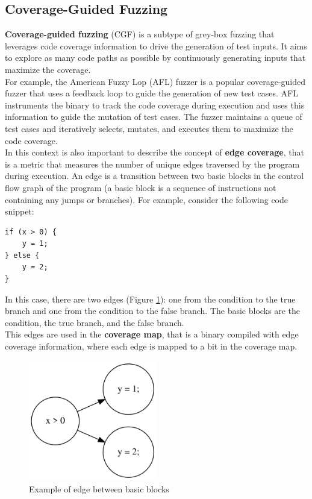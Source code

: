 \subsection{Coverage-Guided Fuzzing}
\textbf{Coverage-guided fuzzing} (CGF) is a subtype of grey-box fuzzing that leverages code coverage information to drive the generation of test inputs. It aims to explore as many code paths as possible by continuously generating inputs that maximize the coverage.
\\For example, the American Fuzzy Lop (AFL) fuzzer is a popular coverage-guided fuzzer that uses a feedback loop to guide the generation of new test cases. AFL instruments the binary to track the code coverage during execution and uses this information to guide the mutation of test cases. The fuzzer maintains a queue of test cases and iteratively selects, mutates, and executes them to maximize the code coverage.
\\In this context is also important to describe the concept of \textbf{edge coverage}, that is a metric that measures the number of unique edges traversed by the program during execution. An edge is a transition between two basic blocks in the control flow graph of the program (a basic block is a sequence of instructions not containing any jumps or branches).
For example, consider the following code snippet:
\begin{lstlisting}
if (x > 0) {
    y = 1;
} else {
    y = 2;
}
\end{lstlisting}
In this case, there are two edges (Figure \ref{fig:sample_edge_graph}): one from the condition to the true branch and one from the condition to the false branch. The basic blocks are the condition, the true branch, and the false branch.
\\This edges are used in the \textbf{coverage map}, that is a binary compiled with edge coverage information, where each edge is mapped to a bit in the coverage map.
\begin{figure}[H]
    \centering
    \includegraphics[width=0.5\textwidth]{Images/sample_edge_graph.png}
    \caption{Example of edge between basic blocks}
    \label{fig:sample_edge_graph}
\end{figure}
